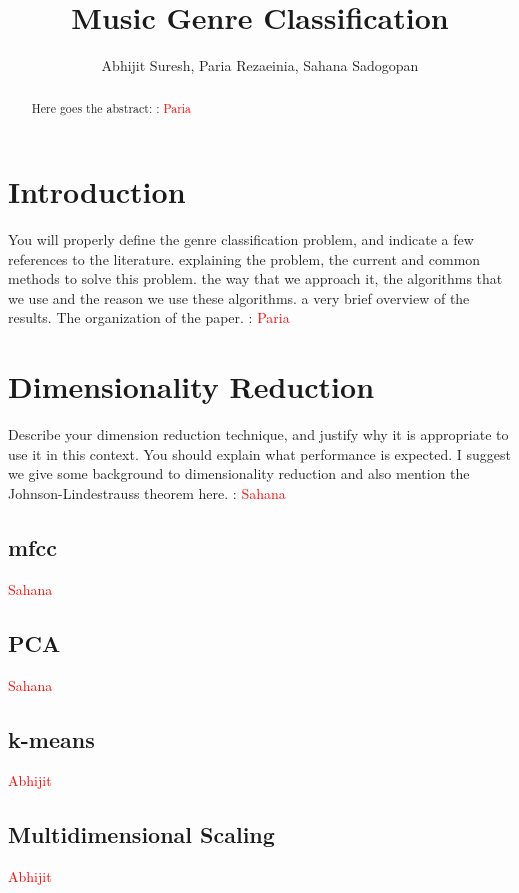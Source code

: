 \documentclass[12pt]{article}
\title{Music Genre Classification}
\author{Abhijit Suresh, Paria Rezaeinia, Sahana Sadogopan}
\begin{document}
	\maketitle
\begin{abstract}
	Here goes the abstract: : \textcolor{red}{Paria}
\end{abstract}
	
\section{Introduction}
You will properly define the genre classification problem, and
indicate a few references to the literature.
explaining the problem, the current and common methods to solve this problem. the way that we approach it, the algorithms that we use and the reason we use these algorithms. a very brief overview of the results. The organization of the paper. : \textcolor{red}{Paria}
\section{Dimensionality Reduction}
Describe your dimension reduction technique, and justify why it 
is appropriate to use it in this context. You should explain what 
performance is expected. 
I suggest we give some background to dimensionality reduction and also mention the Johnson-Lindestrauss theorem here. : \textcolor{red}{Sahana}
\subsection{mfcc} \textcolor{red}{Sahana}

\subsection{PCA} \textcolor{red}{Sahana}

\subsection{k-means} \textcolor{red}{Abhijit}

\subsection{Multidimensional Scaling} \textcolor{red}{Abhijit}
\end{document}
